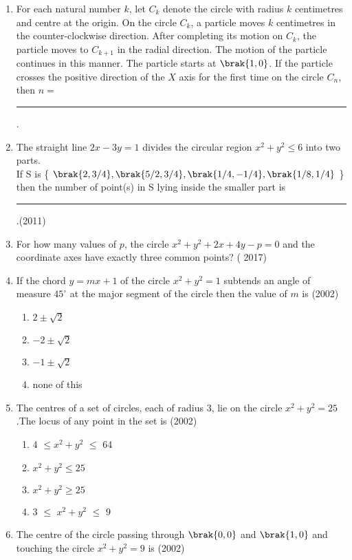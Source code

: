 \begin{enumerate}
%
	\hfill{}
\item For each natural number $k$,  let $C_k$ denote the circle with radius $k$ centimetres and centre at the origin. On the circle $C_k$,  a particle moves $k$ centimetres in the counter-clockwise direction. After completing its motion on $C_k$,  the particle moves to $C_{k+1}$ in the radial direction. The motion of the particle continues in this manner. The particle starts at $\brak{1, 0}$. If the particle crosses the positive direction of the $X$ axis for the first time on the circle $C_n$, then $n=$\rule{1cm}{0.01pt}.
%
	\hfill{}
\item The straight line $2x-3y=1$ divides the circular region $x^2+y^2\leq6$ into two parts.\\
If  S  is \{ $\brak{2, 3/4}, \brak{5/2, 3/4}, \brak{1/4, -1/4}, \brak{1/8, 1/4}$ \}  then the  number of point(s) in S lying inside the smaller part is  \rule{1cm}{0.01pt}.\hfill(2011)
\item For how many values of $p$,  the circle $x^2+y^2+2x+4y-p=0$ and the coordinate axes have exactly three common points? \hfill( 2017)
\item If the chord $y=mx+1$ of the circle $x^2+y^2=1$ subtends an angle of measure \( 45^\circ \) at the major segment of the circle then the value of $m$ is \hfill(2002)
\begin{multicols}{4}
\begin{enumerate}
\item$2\pm\sqrt{2}$
\item$-2\pm\sqrt{2}$
\item$-1\pm\sqrt{2}$
\item none of this
\end{enumerate}
\end{multicols}
\item The centres of a set of circles, each of radius $3$,  lie on the circle $x^2+y^2=25$.The locus of any point in the set is \hfill(2002)
\begin{multicols}{2}
\begin{enumerate}
\item$4$ $\leq$$x^2+y^2$ $\leq$ $64$
\item$x^2+y^2\leq25$
\item$x^2+y^2\geq25$
\item$3$ $\leq$ $x^2+y^2$ $\leq$ $9$
\end{enumerate}
\end{multicols}
\item The centre of the circle passing through $\brak{0, 0}$ and $\brak{1, 0}$ and touching the circle $x^2+y^2=9$ is \hfill(2002)

\end{enumerate}
